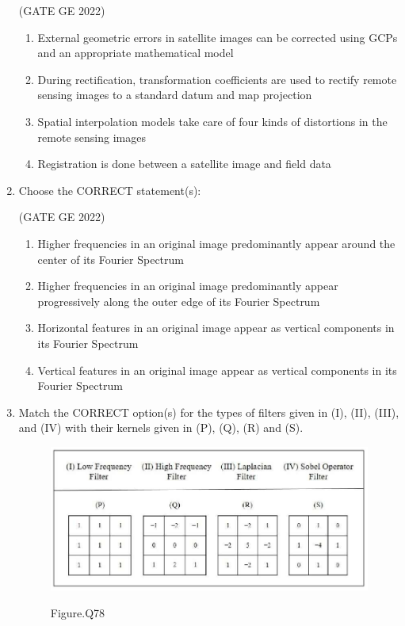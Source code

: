 \documentclass[journal,12pt,onecolumn]{IEEEtran}
\theoremstyle{remark}
\begin{document}
\begin{enumerate}
\hfill (GATE GE 2022)

\begin{enumerate}
    \item External geometric errors in satellite images can be corrected using GCPs and an appropriate mathematical model
    \item During rectification, transformation coefficients are used to rectify remote sensing images to a standard datum and map projection
    \item Spatial interpolation models take care of four kinds of distortions in the remote sensing images
    \item Registration is done between a satellite image and field data
\end{enumerate}

\item Choose the CORRECT statement(s):

\hfill (GATE GE 2022)

\begin{enumerate}
    \item Higher frequencies in an original image predominantly appear around the center of its Fourier Spectrum
    \item Higher frequencies in an original image predominantly appear progressively along the outer edge of its Fourier Spectrum
    \item Horizontal features in an original image appear as vertical components in its Fourier Spectrum
    \item Vertical features in an original image appear as vertical components in its Fourier Spectrum
\end{enumerate}

\item Match the CORRECT option(s) for the types of filters given in (I), (II), (III), and (IV) with their kernels given in (P), (Q), (R) and (S).
\begin{figure}[H]
    \centering
    \includegraphics[width=0.9\columnwidth]{figs/fig_78.png}
    \label{fig:question78}
    \caption*{Figure.Q78}
\end{figure}


\end{enumerate}
\end{document}
